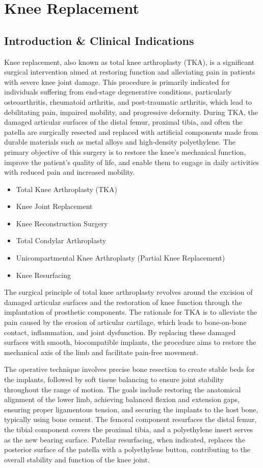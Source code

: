 \chapter{Knee Replacement}

\section*{Introduction \& Clinical Indications}
Knee replacement, also known as total knee arthroplasty (TKA), is a significant surgical intervention aimed at restoring function and alleviating pain in patients with severe knee joint damage. This procedure is primarily indicated for individuals suffering from end-stage degenerative conditions, particularly osteoarthritis, rheumatoid arthritis, and post-traumatic arthritis, which lead to debilitating pain, impaired mobility, and progressive deformity. During TKA, the damaged articular surfaces of the distal femur, proximal tibia, and often the patella are surgically resected and replaced with artificial components made from durable materials such as metal alloys and high-density polyethylene. The primary objective of this surgery is to restore the knee's mechanical function, improve the patient's quality of life, and enable them to engage in daily activities with reduced pain and increased mobility.

\begin{itemize}
  \item Total Knee Arthroplasty (TKA)
  \item Knee Joint Replacement
  \item Knee Reconstruction Surgery
  \item Total Condylar Arthroplasty
  \item Unicompartmental Knee Arthroplasty (Partial Knee Replacement)
  \item Knee Resurfacing
\end{itemize}

The surgical principle of total knee arthroplasty revolves around the excision of damaged articular surfaces and the restoration of knee function through the implantation of prosthetic components. The rationale for TKA is to alleviate the pain caused by the erosion of articular cartilage, which leads to bone-on-bone contact, inflammation, and joint dysfunction. By replacing these damaged surfaces with smooth, biocompatible implants, the procedure aims to restore the mechanical axis of the limb and facilitate pain-free movement.

The operative technique involves precise bone resection to create stable beds for the implants, followed by soft tissue balancing to ensure joint stability throughout the range of motion. The goals include restoring the anatomical alignment of the lower limb, achieving balanced flexion and extension gaps, ensuring proper ligamentous tension, and securing the implants to the host bone, typically using bone cement. The femoral component resurfaces the distal femur, the tibial component covers the proximal tibia, and a polyethylene insert serves as the new bearing surface. Patellar resurfacing, when indicated, replaces the posterior surface of the patella with a polyethylene button, contributing to the overall stability and function of the knee joint.

